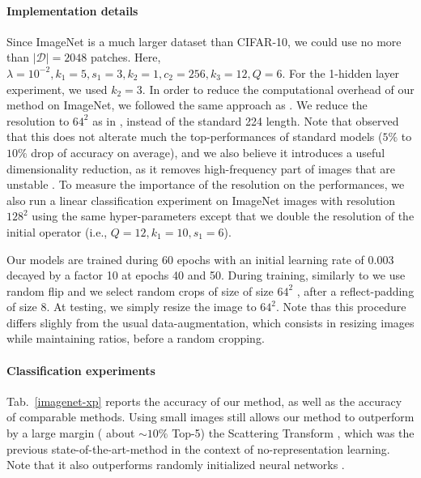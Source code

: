 \documentclass{article}
\begin{document}
\paragraph{Implementation details}  Since ImageNet is a much larger dataset than CIFAR-10, we could  use no more than $|\mathcal{D}|=2048$ patches.
Here, $\lambda=10^{-2}, k_1=5,s_1=3, k_2=1, c_2=256, k_3=12, Q=6$. For the 1-hidden layer experiment, we used $k_2=3$.
In order to reduce the computational overhead of our method on ImageNet, we followed the same approach as \cite{DBLP:journals/corr/ChrabaszczLH17}. We reduce the resolution to $64^2$ as in \cite{DBLP:journals/corr/ChrabaszczLH17}, instead of the standard 224 length.  Note that \cite{DBLP:journals/corr/ChrabaszczLH17}  observed that this does not alterate much the top-performances of standard models ($5 \%$ to $10\%$ drop of accuracy on average), and we also believe it introduces a useful dimensionality reduction, as it removes high-frequency part of images that are  unstable
\citet{mallat1999wavelet}.
To measure the importance of the resolution on the performances, we also run a linear classification experiment on  ImageNet images with resolution $128^2$ using the same hyper-parameters except that we double the resolution of the initial operator (i.e., $Q=12, k_1=10,s_1=6$).

Our models are trained during 60 epochs with an initial learning rate of 0.003 decayed by a factor 10 at epochs 40 and 50.
During training, similarly to \cite{DBLP:journals/corr/ChrabaszczLH17} we use random flip and we select random crops of size of size $64^2$ , after a reflect-padding of size 8. At testing, we simply resize the image to $64^2$.
Note thas this procedure differs slighly from the usual data-augmentation, which consists in resizing images while maintaining ratios, before a random cropping.








\paragraph{Classification experiments}
Tab.~\ref{imagenet-xp} reports the accuracy of our method, as well as the accuracy of comparable methods. Using small images still allows our method to outperform by a large margin ( about $\sim 10\%$ Top-5) the  Scattering Transform \citep{mallat2012group}, which was the previous state-of-the-art-method in the context of no-representation learning. Note that it also outperforms randomly initialized neural networks \citep{arandjelovic2017look}.
\end{document}
